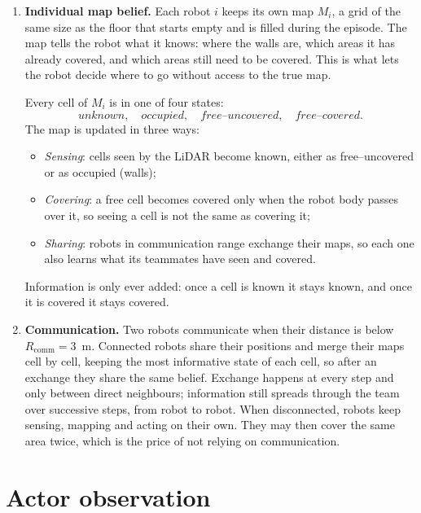 \documentclass[11pt,a4paper]{article}
\begin{document}
\begin{enumerate}[label=\textbf{\arabic*.},resume]

\item \textbf{Individual map belief.}
\label{item:individual_map_belief}
Each robot $i$ keeps its own map $M_i$, a grid of the same size as the
floor that starts empty and is filled during the episode. The map tells the
robot what it knows: where the walls are, which areas it has already
covered, and which areas still need to be covered. This is what lets the
robot decide where to go without access to the true map.

Every cell of $M_i$ is in one of four states:
\[
 \textit{unknown},\quad
 \textit{occupied},\quad
 \textit{free--uncovered},\quad
 \textit{free--covered}.
\]
The map is updated in three ways:
\begin{itemize}
 \item \textit{Sensing}: cells seen by the LiDAR become known, either as
       free--uncovered or as occupied (walls);
 \item \textit{Covering}: a free cell becomes covered only when the robot
       body passes over it, so seeing a cell is not the same as covering it;
 \item \textit{Sharing}: robots in communication range exchange their maps,
       so each one also learns what its teammates have seen and covered.
\end{itemize}
Information is only ever added: once a cell is known it stays known, and
once it is covered it stays covered.

\item \textbf{Communication.}
Two robots communicate when their distance is below
$R_{\mathrm{comm}}=3$~m. Connected robots share their positions and merge
their maps cell by cell, keeping the most informative state of each cell,
so after an exchange they share the same belief. Exchange happens at every
step and only between direct neighbours; information still spreads through
the team over successive steps, from robot to robot. When disconnected,
robots keep sensing, mapping and acting on their own. They may then cover
the same area twice, which is the price of not relying on communication.

\end{enumerate}

\section{Actor observation}
\end{document}

